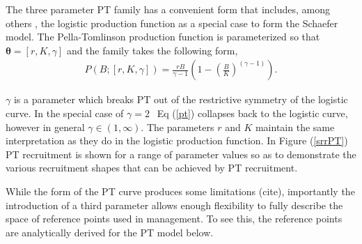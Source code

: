 \documentclass[12pt]{article}
\begin{document}
The three parameter PT family has a convenient form that includes, among 
others , the 
logistic production function as a special case to form the Schaefer model. The 
Pella-Tomlinson production function is parameterized so that $\bm{\theta} = [r, K, \gamma]$ 
and the family takes the following form, 
\begin{align}
P(B; [r, K, \gamma]) = \frac{r B}{\gamma-1} \left(1-\left(\frac{B}{K}\right)^{(\gamma-1)}\right). \label{pt}
\end{align}
%

%
$\gamma$ is a parameter which breaks PT out of the restrictive symmetry of the 
logistic curve. In the special case of $\gamma=2~~$ Eq (\ref{pt}) 
collapses back to the logistic curve, however in general $\gamma\in(1, \infty)$.
The parameters $r$ and $K$ maintain the same interpretation as 
they do in the logistic production function. In Figure (\ref{srrPT}) PT recruitment 
is shown for a range of parameter values so as to demonstrate the various 
recruitment shapes that can be achieved by PT recruitment.  



%
While the form of the PT curve produces some limitations {(\color{red}cite)}, 
importantly the %
introduction of a third parameter allows enough flexibility to fully describe 
the space of reference points used in management. To see this, the reference 
points are analytically derived for the PT model below. %
\end{document}
